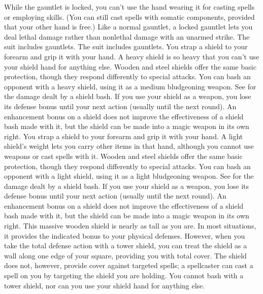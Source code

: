 \par While the gauntlet is locked, you can't use the hand wearing it for casting spells or employing skills. (You can still cast spells with somatic components, provided that your other hand is free.)
Like a normal gauntlet, a locked gauntlet lets you deal lethal damage rather than nonlethal damage with an unarmed strike.
 The suit includes gauntlets.
 The suit includes gauntlets.
 You strap a shield to your forearm and grip it with your hand. A heavy shield is so heavy that you can't use your shield hand for anything else.
 Wooden and steel shields offer the same basic protection, though they respond differently to special attacks.
 You can bash an opponent with a heavy shield, using it as a medium bludgeoning weapon. See  for the damage dealt by a shield bash.  If you use your shield as a weapon, you lose its defense bonus until your next action (usually until the next round). An enhancement bonus on a shield does not improve the effectiveness of a shield bash made with it, but the shield can be made into a magic weapon in its own right.
 You strap a shield to your forearm and grip it with your hand. A light shield's weight lets you carry other items in that hand, although you cannot use weapons or cast spells with it.
 Wooden and steel shields offer the same basic protection, though they respond differently to special attacks.
 You can bash an opponent with a light shield, using it as a light bludgeoning weapon. See  for the damage dealt by a shield bash. If you use your shield as a weapon, you lose its defense bonus until your next action (usually until the next round). An enhancement bonus on a shield does not improve the effectiveness of a shield bash made with it, but the shield can be made into a magic weapon in its own right.
 This massive wooden shield is nearly as tall as you are. In most situations, it provides the indicated bonus to your physical defenses. However, when you take the total defense action with a tower shield, you can treat the shield as a wall along one edge of your square, providing you with total cover. The shield does not, however, provide cover against targeted spells; a spellcaster can cast a spell on you by targeting the shield you are holding. You cannot bash with a tower shield, nor can you use your shield hand for anything else.
